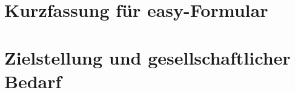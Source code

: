\documentclass[a4paper,11pt,twoside]{scrartcl}
\begin{document}
\onehalfspacing

\clearpage


{\singlespacing

}

\setcounter{page}{1}

\section*{Kurzfassung für easy-Formular}

\section{Zielstellung und gesellschaftlicher Bedarf}
\label{sec:ziel}
\end{document}
